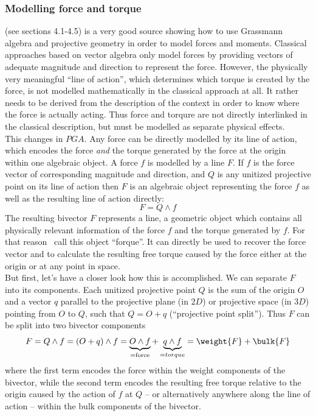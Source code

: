 \subsubsection{Modelling force and torque}
\label{subsubsection_modelling_force_and_torque}

\cite{Browne_Grassmann-Algebra_Vol1:2012} (see sections 4.1-4.5) is a very good source
showing how to use Grassmann algebra and projective geometry in order to model forces and
moments. Classical approaches based on vector algebra only model forces by providing
vectors of adequate magnitude and direction to represent the force. However, the
physically very meaningful ``line of action'', which determines which torque is created by
the force, is not modelled mathematically in the classical approach at all. It rather
needs to be derived from the description of the context in order to know where the force
is actually acting. Thus force and torqure are not directly interlinked in the classical
description, but must be modelled as separate physical effects.\\

This changes in $PGA$. Any force can be directly modelled by its line of action, which
encodes the force \emph{and} the torque generated by the force at the origin within one
algebraic object. A force $f$ is modelled by a line $F$. If $f$ is the force vector of
corresponding magnitude and direction, and $Q$ is any unitized projective point on its
line of action then $F$ is an algebraic object representing the force $f$ as well as the
resulting line of action directly:
\begin{equation}
F = Q \wedge f
\label{eq:line_of_action}
\end{equation}
The resulting bivector $F$ represents a line, a geometric object which contains all
physically relevant information of the force $f$ and the torque generated by $f$. For that
reason~\cite{Dynamics_in_PGA_plane-based_Dorst-DeKennik:2023} call this object ``forque''.
It can directly be used to recover the force vector and to calculate the resulting free
torque caused by the force either at the origin or at any point in space. \\

But first, let's have a closer look how this is accomplished. We can separate $F$ into its
components. Each unitized projective point $Q$ is the sum of the origin $O$ and a vector
$q$ parallel to the projective plane (in $2D$) or projective space (in $3D$) pointing from
$O$ to $Q$, such that $Q = O + q$ (``projective point split''). Thus $F$ can be split into
two bivector components
\begin{equation}
    F = Q \wedge f = (O + q) \wedge f =
    \underbrace{O \wedge f}_{\text{=force}} + \underbrace{q \wedge f}_{=torque}
    = \weight{F} + \bulk{F}
\label{eq:line_of_action_components}
\end{equation}
where the first term encodes the force within the weight components of the bivector, while
the second term encodes the resulting free torque relative to the origin caused by the
action of $f$ at $Q$ -- or alternatively anywhere along the line of action -- within the
bulk components of the bivector. \\


